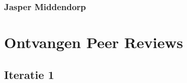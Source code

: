 \documentclass[a4paper]{report}
\begin{document}
\subsubsection{Jasper Middendorp}
\begin{minipage}{\textwidth}
  \centering
\end{minipage}




\section{Ontvangen Peer Reviews}
\subsection{Iteratie 1}
\end{document}
